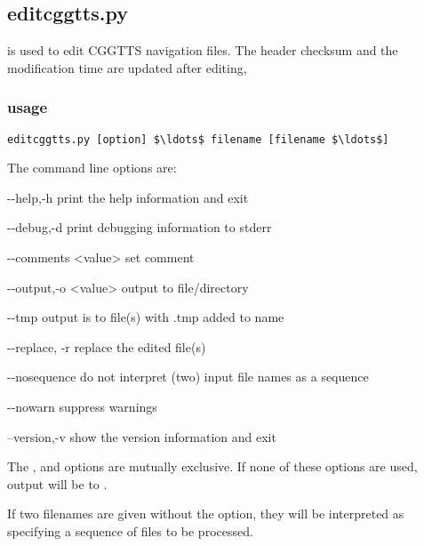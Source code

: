 \subsection{editcggtts.py}

\hypertarget{h:editcggtts}{}

 is used to edit CGGTTS navigation files. 
The header checksum and the modification time are updated after editing, 

\subsubsection{usage}

\begin{lstlisting}[mathescape=true]
editcggtts.py [option] $\ldots$ filename [filename $\ldots$]
\end{lstlisting}
The command line options are:
\begin{description*}
	\item[-{}-help,-h]	print the help information and exit
	\item[-{}-debug,-d]	print debugging information to stderr
	\item[-{}-comments \textless{value}\textgreater] set comment
  \item[-{}-output,-o \textless{value}\textgreater] output to file/directory 
  \item[-{}-tmp]    output is to file(s) with .tmp added to name
  \item[-{}-replace, -r]  replace the edited file(s)
  \item[-{}-nosequence]  do not interpret (two) input file names as a sequence
  \item[-{}-nowarn]  suppress warnings
	\item[--version,-v] show the version information and exit
\end{description*}

The ,  and  options are mutually exclusive. 
If none of these options are used, output will be to .

If two filenames are given without the  option, they will be
interpreted as specifying a sequence of files to be processed.
